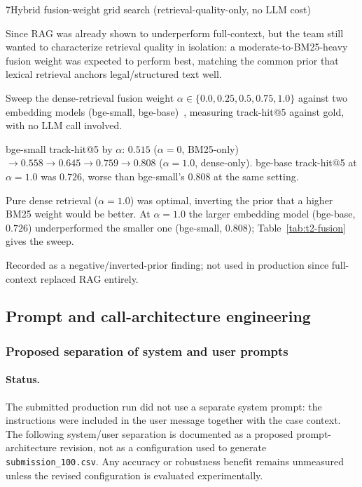 \begin{explog}{7}{Hybrid fusion-weight grid search (retrieval-quality-only, no LLM cost)}
\item[Hypothesis] Since RAG was already shown to underperform full-context, but the team still wanted to characterize retrieval quality in isolation: a moderate-to-BM25-heavy fusion weight was expected to perform best, matching the common prior that lexical retrieval anchors legal/structured text well.
\item[Method] Sweep the dense-retrieval fusion weight $\alpha \in \{0.0, 0.25, 0.5, 0.75, 1.0\}$ against two embedding models (bge-small, bge-base)~\cite{xiao2024bge}, measuring track-hit@5 against gold, with no LLM call involved.
\item[Result] bge-small track-hit@5 by $\alpha$: $0.515$ ($\alpha=0$, BM25-only) $\to 0.558 \to 0.645 \to 0.759 \to 0.808$ ($\alpha=1.0$, dense-only). bge-base track-hit@5 at $\alpha=1.0$ was $0.726$, worse than bge-small's $0.808$ at the same setting.
\item[Inference] Pure dense retrieval ($\alpha=1.0$) was optimal, inverting the prior that a higher BM25 weight would be better. At $\alpha=1.0$ the larger embedding model (bge-base, $0.726$) underperformed the smaller one (bge-small, $0.808$); Table~\ref{tab:t2-fusion} gives the sweep.
\item[Verdict] Recorded as a negative/inverted-prior finding; not used in production since full-context replaced RAG entirely.
\end{explog}


\subsection{Prompt and call-architecture engineering}

\subsubsection{Proposed separation of system and user prompts}
\label{sec:t2-system-prompt}

\paragraph{Status.}
The submitted production run did not use a separate system prompt: the instructions
were included in the user message together with the case context. The following
system/user separation is documented as a proposed prompt-architecture revision,
not as a configuration used to generate \texttt{submission\_100.csv}. Any accuracy
or robustness benefit remains unmeasured unless the revised configuration is
evaluated experimentally.

